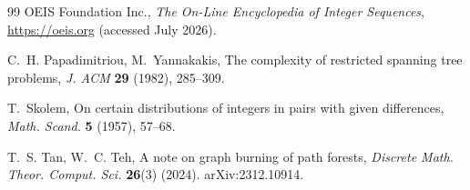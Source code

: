 \documentclass[11pt]{article}
\theoremstyle{definition}
\theoremstyle{remark}
\begin{document}
\begin{thebibliography}{99}
OEIS Foundation Inc.,
\emph{The On-Line Encyclopedia of Integer Sequences},
\url{https://oeis.org} (accessed July 2026).

C.~H. Papadimitriou, M.~Yannakakis,
The complexity of restricted spanning tree problems,
\emph{J. ACM} \textbf{29} (1982), 285--309.

T.~Skolem,
On certain distributions of integers in pairs with given differences,
\emph{Math. Scand.} \textbf{5} (1957), 57--68.

T.~S. Tan, W.~C. Teh,
A note on graph burning of path forests,
\emph{Discrete Math. Theor. Comput. Sci.} \textbf{26}(3) (2024). arXiv:2312.10914.

\end{thebibliography}
\end{document}
